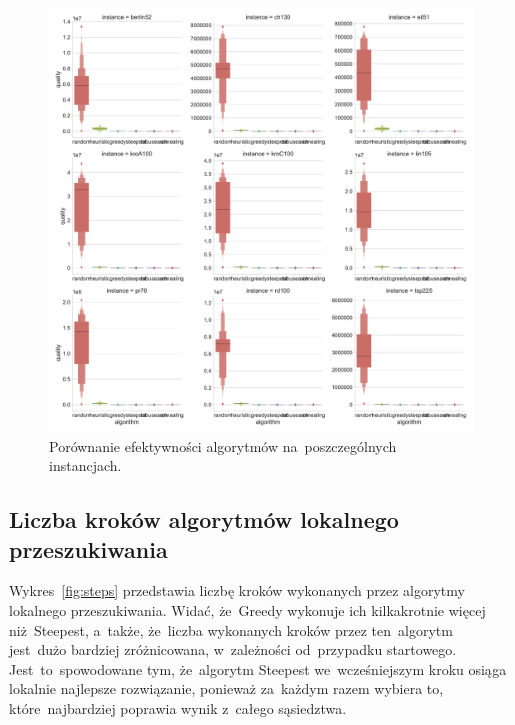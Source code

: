 \begin{figure}[H]
\begin{center}
\includegraphics[width=1.0\textwidth]{graphs/quality_comparison_letval.pdf}
\end{center}
\caption{Porównanie efektywności algorytmów na~poszczególnych instancjach.}
\label{fig:quality}
\end{figure}

\subsection{Liczba kroków algorytmów lokalnego przeszukiwania}

Wykres~\ref{fig:steps} przedstawia liczbę kroków wykonanych przez algorytmy lokalnego przeszukiwania. Widać, że~Greedy wykonuje ich kilkakrotnie więcej niż~Steepest, a~także, że~liczba wykonanych kroków przez ten~algorytm jest~dużo bardziej zróżnicowana, w~zależności od~przypadku startowego. Jest~to~spowodowane tym, że~algorytm Steepest we~wcześniejszym kroku osiąga lokalnie najlepsze rozwiązanie, ponieważ za~każdym razem wybiera to, które~najbardziej poprawia wynik z~całego sąsiedztwa.

